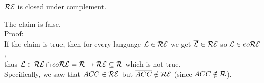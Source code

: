 $\mathcal{R}\mathcal{E}$ is closed under complement.

The claim is false. \\

Proof: \\
If the claim is true, then for every language $\mathcal{L} \in \mathcal{R}\mathcal{E}$ we get $\overline{\mathcal{L}} \in \mathcal{R}\mathcal{E}$ so $\mathcal{L} \in co\mathcal{R}\mathcal{E}$, \\
thus $\mathcal{L} \in \mathcal{R}\mathcal{E} \cap co\mathcal{R}\mathcal{E} = \mathcal{R} \rightarrow \mathcal{R}\mathcal{E} \subseteq \mathcal{R}$ which is not true. \\
Specifically, we saw that $ACC \in \mathcal{R}\mathcal{E}$ but $\overline{ACC} \notin \mathcal{R}\mathcal{E}$ (since $ACC \notin \mathcal{R}$). \\

